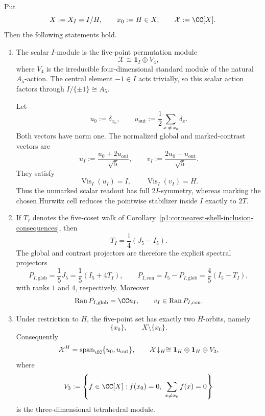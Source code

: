 \documentclass[11pt]{article}
\begin{document}
\begin{theorem}
\label{p1:thm:exceptional-core-visibility}
Put
\[
    X:=X_I=I/H,
    \qquad
    x_0:=H\in X,
    \qquad
    \mathcal X:=\CC[X].
\]
Then the following statements hold.

\begin{enumerate}[label=\textup{(\roman*)}]
\item The scalar \(I\)-module is the five-point permutation module
\begin{equation}
\label{p1:eq:five-cell-permutation-branching}
    \mathcal X\cong\mathbf1_I\oplus V_4,
\end{equation}
where \(V_4\) is the irreducible four-dimensional standard module of the
natural \(A_5\)-action.  The central element \(-1\in I\) acts trivially, so
this scalar action factors through \(I/\{\pm1\}\cong A_5\).

Let
\[
    u_0:=\delta_{x_0},
    \qquad
    u_{\mathrm{out}}
    :=\frac12\sum_{x\ne x_0}\delta_x.
\]
Both vectors have norm one.  The normalized global and marked-contrast
vectors are
\begin{equation}
\label{p1:eq:global-marked-icosahedral-vectors}
    u_I:=\frac{u_0+2u_{\mathrm{out}}}{\sqrt5},
    \qquad
    v_I:=\frac{2u_0-u_{\mathrm{out}}}{\sqrt5}.
\end{equation}
They satisfy
\[
    \operatorname{Vis}_I(u_I)=I,
    \qquad
    \operatorname{Vis}_I(v_I)=H.
\]
Thus the unmarked scalar readout has full \(2I\)-symmetry, whereas marking
the chosen Hurwitz cell reduces the pointwise stabilizer inside \(I\) exactly
to \(2T\).

\item If \(T_I\) denotes the five-coset walk of
Corollary~\ref{p1:cor:nearest-shell-inclusion-consequences}, then
\[
    T_I=\frac14(J_5-I_5).
\]
The global and contrast projectors are therefore the explicit spectral
projectors
\begin{equation}
\label{p1:eq:icosahedral-global-contrast-projectors}
    P_{I,\mathrm{glob}}
    =\frac15J_5
    =\frac15(I_5+4T_I),
    \qquad
    P_{I,\mathrm{con}}
    =I_5-P_{I,\mathrm{glob}}
    =\frac45(I_5-T_I),
\end{equation}
with ranks \(1\) and \(4\), respectively.  Moreover
\[
    \operatorname{Ran}P_{I,\mathrm{glob}}=\CC u_I,
    \qquad
    v_I\in\operatorname{Ran}P_{I,\mathrm{con}}.
\]

\item Under restriction to \(H\), the five-point set has exactly two
\(H\)-orbits, namely
\[
    \{x_0\},
    \qquad
    X\setminus\{x_0\}.
\]
Consequently
\begin{equation}
\label{p1:eq:H-fixed-recentered-plane}
    \mathcal X^H
    =\operatorname{span}_{\CC}\{u_0,u_{\mathrm{out}}\},
    \qquad
    \mathcal X\!\downarrow_H
    \cong\mathbf1_H\oplus\mathbf1_H\oplus V_3,
\end{equation}
where
\[
    V_3
    :=\left\{f\in\CC[X]:
      f(x_0)=0,\ 
      \sum_{x\ne x_0}f(x)=0
      \right\}
\]
is the three-dimensional tetrahedral module.


\end{enumerate}
\end{theorem}
\end{document}
